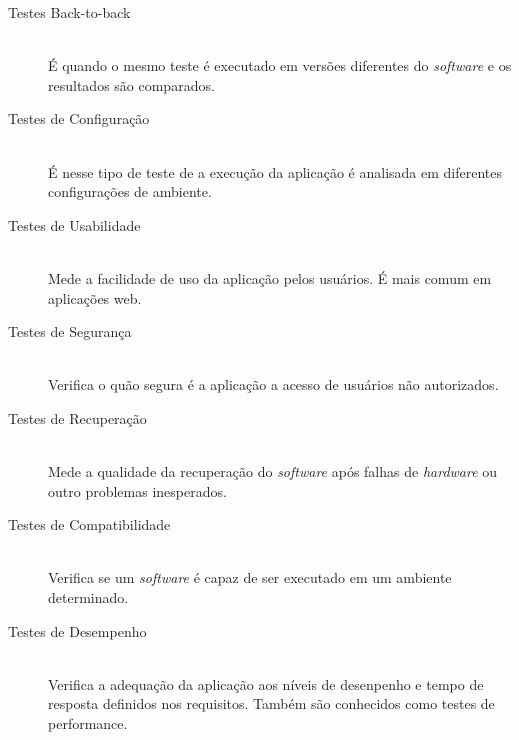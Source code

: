 
\begin{description}

\item[Testes Back-to-back] \hfill \\

É quando o mesmo teste é executado em versões diferentes do \textit{software} e os resultados são comparados.

\item[Testes de Configuração] \hfill \\

É nesse tipo de teste de a execução da aplicação é analisada em diferentes configurações de ambiente.

\item[Testes de Usabilidade] \hfill \\

Mede a facilidade de uso da aplicação pelos usuários. É mais comum em aplicações web.

\item[Testes de Segurança] \hfill \\

Verifica o quão segura é a aplicação a acesso de usuários não autorizados.

\item[Testes de Recuperação] \hfill \\

Mede a qualidade da recuperação do \textit{software} após falhas de \textit{hardware} ou outro problemas inesperados.

\item[Testes de Compatibilidade] \hfill \\

Verifica se um \textit{software} é capaz de ser executado em um ambiente determinado.

\item[Testes de Desempenho] \hfill \\

Verifica a adequação da aplicação aos níveis de desenpenho e tempo de resposta definidos nos requisitos. Também são conhecidos como testes de performance.

\end{description}



